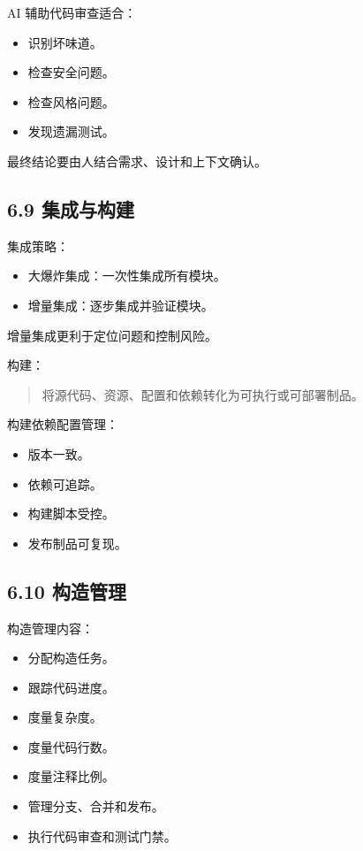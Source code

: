 \documentclass[UTF8,zihao=-4]{ctexart}
\begin{document}
AI 辅助代码审查适合：

\begin{itemize}
\item 识别坏味道。
\item 检查安全问题。
\item 检查风格问题。
\item 发现遗漏测试。
\end{itemize}

最终结论要由人结合需求、设计和上下文确认。

\subsection{6.9 集成与构建}

集成策略：

\begin{itemize}
\item 大爆炸集成：一次性集成所有模块。
\item 增量集成：逐步集成并验证模块。
\end{itemize}

增量集成更利于定位问题和控制风险。

构建：

\begin{quote}
将源代码、资源、配置和依赖转化为可执行或可部署制品。
\end{quote}

构建依赖配置管理：

\begin{itemize}
\item 版本一致。
\item 依赖可追踪。
\item 构建脚本受控。
\item 发布制品可复现。
\end{itemize}

\subsection{6.10 构造管理}

构造管理内容：

\begin{itemize}
\item 分配构造任务。
\item 跟踪代码进度。
\item 度量复杂度。
\item 度量代码行数。
\item 度量注释比例。
\item 管理分支、合并和发布。
\item 执行代码审查和测试门禁。
\end{itemize}
\end{document}
